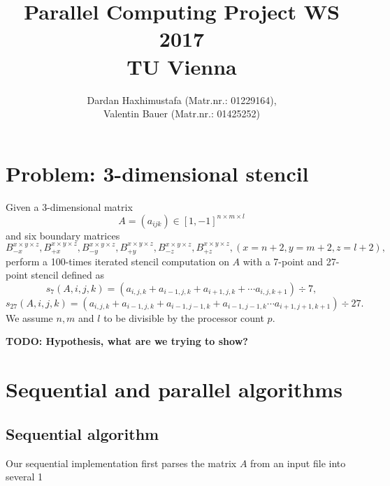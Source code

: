 \documentclass[]{article}
\title{Parallel Computing Project WS 2017\\TU Vienna}
\author{Dardan Haxhimustafa (Matr.nr.: 01229164),\\Valentin Bauer (Matr.nr.: 01425252)}
\begin{document}
\maketitle

\begin{abstract}

\end{abstract}

\section{Problem: 3-dimensional stencil}
Given a 3-dimensional matrix 
$$A = (a_{ijk}) \in [1,-1]^{n \times m \times l}$$
and six boundary matrices
$$B^{x \times y \times z}_{-x}, B^{x \times y \times z}_{+x},B^{x \times y \times z}_{-y},B^{x \times y \times z}_{+y},B^{x \times y \times z}_{-z},B^{x \times y \times z}_{+z}, (x=n+2, y=m+2, z=l+2),$$
perform a 100-times iterated stencil computation on $A$ with a 7-point and 27-point stencil defined as
$$s_7(A,i,j,k)=(a_{i,j,k} + a_{i-1,j,k} + a_{i+1,j,k} + \cdots a_{i,j,k+1}) \div 7,$$
$$s_{27}(A,i,j,k)=(a_{i,j,k} + a_{i-1,j,k} + a_{i-1,j-1,k} + a_{i-1,j-1,k}\cdots a_{i+1,j+1,k+1}) \div 27.$$ We assume $n, m$ and $l$ to be divisible by the processor count $p$. 

\textbf{TODO: Hypothesis, what are we trying to show?}

\section{Sequential and parallel algorithms}
\subsection{Sequential algorithm}
Our sequential implementation first parses the matrix $A$ from an input file into several 1
\end{document}
